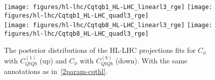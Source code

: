 \begin{figure}[htpb!]
\begin{center}
	\begin{center}
		\texttt{[image: figures/hl-lhc/Cqtqb1\_HL-LHC\_linearl3\_rge]}
		\texttt{[image: figures/hl-lhc/Cqtqb1\_HL-LHC\_quadl3\_rge]} \\ 
		\texttt{[image: figures/hl-lhc/Cqtqb8\_HL-LHC\_linearl3\_rge]}
		\texttt{[image: figures/hl-lhc/Cqtqb8\_HL-LHC\_quadl3\_rge]} 
	\end{center}
\end{center}
\caption{The posterior distributions of the HL-LHC projections fits for $C_\phi$ with $C_{QtQb}^{(1)}$ (up) and $C_\phi$ with $C_{QtQb}^{(8)}$ (down). With the same annotations as in~\autoref{2param-cqthl}.  \label{2param-cqtqbhl}}
\end{figure}